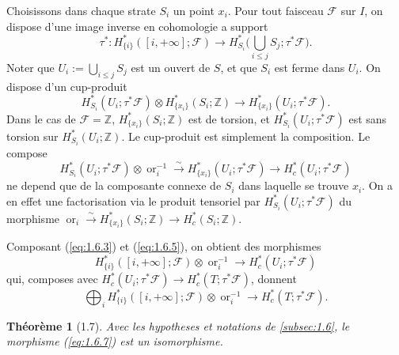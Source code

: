 \documentclass[11pt,a4paper]{article}
\theoremstyle{plain}
\newtheorem{theorem}{Th\'eor\`eme}[section]
\theoremstyle{definition}
\newcommand{\ori}{\operatorname{or}}
\begin{document}
Choisissons dans chaque strate $S_i$ un point $x_i$. Pour tout faisceau $\mathcal{F}$ sur $I$, on dispose d'une image inverse en cohomologie a support
\begin{equation}\label{eq:1.6.3}
\tau^*: H^*_{\{i\}}([i,+\infty];\mathcal{F}) \longrightarrow H^*_{S_i}\Big(\bigcup_{i \leq j} S_j;\tau^*\mathcal{F}\Big).
\tag{1.6.3}
\end{equation}
Noter que $U_i := \bigcup_{i \leq j} S_j$ est un ouvert de $S$, et que $S_i$ est ferme dans $U_i$. On dispose d'un cup-produit
\begin{equation}\label{eq:1.6.4}
H^*_{S_i}(U_i;\tau^*\mathcal{F}) \otimes H^*_{\{x_i\}}(S_i;\mathbb{Z}) \longrightarrow H^*_{\{x_i\}}(U_i;\tau^*\mathcal{F}).
\tag{1.6.4}
\end{equation}
Dans le cas de $\mathcal{F} = \mathbb{Z}$, $H^*_{\{x_i\}}(S_i;\mathbb{Z})$ est de torsion, et $H^*_{S_i}(U_i;\tau^*\mathcal{F})$ est sans torsion sur $H^*_{S_i}(U_i;\mathbb{Z})$. Le cup-produit est simplement la composition. Le compose
\begin{equation}\label{eq:1.6.5}
H^*_{S_i}(U_i;\tau^*\mathcal{F}) \otimes \ori_i^{-1} \xrightarrow{\sim} H^*_{\{x_i\}}(U_i;\tau^*\mathcal{F}) \longrightarrow H^*_c(U_i;\tau^*\mathcal{F})
\tag{1.6.5}
\end{equation}
ne depend que de la composante connexe de $S_i$ dans laquelle se trouve $x_i$. On a en effet une factorisation via le produit tensoriel par $H^*_{S_i}(U_i;\tau^*\mathcal{F})$ du morphisme $\ori_i \xrightarrow{\sim} H^*_{\{x_i\}}(S_i;\mathbb{Z}) \to H^*_c(S_i;\mathbb{Z})$.

Composant (\ref{eq:1.6.3}) et (\ref{eq:1.6.5}), on obtient des morphismes
\begin{equation}\label{eq:1.6.6}
H^*_{\{i\}}([i,+\infty];\mathcal{F}) \otimes \ori_i^{-1} \longrightarrow H^*_c(U_i;\tau^*\mathcal{F})
\tag{1.6.6}
\end{equation}
qui, composes avec $H^*_c(U_i;\tau^*\mathcal{F}) \to H^*_c(T;\tau^*\mathcal{F})$, donnent
\begin{equation}\label{eq:1.6.7}
\bigoplus_i H^*_{\{i\}}([i,+\infty];\mathcal{F}) \otimes \ori_i^{-1} \longrightarrow H^*_c(T;\tau^*\mathcal{F}).
\tag{1.6.7}
\end{equation}

\begin{theorem}[1.7]\label{thm:1.7}
Avec les hypotheses et notations de \ref{subsec:1.6}, le morphisme (\ref{eq:1.6.7}) est un isomorphisme.
\end{theorem}
\end{document}
